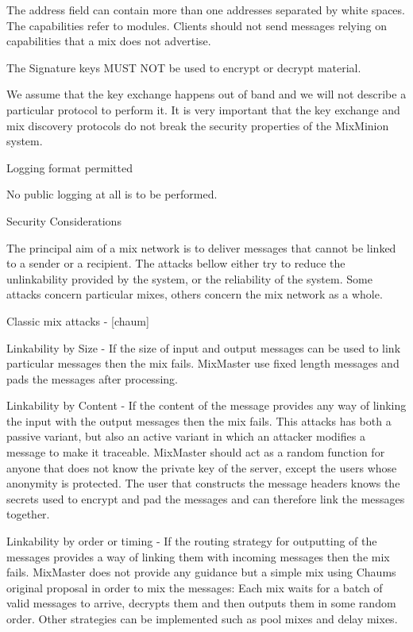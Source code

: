 The address field can contain more than one addresses separated by
white spaces. The capabilities refer to modules. Clients should not 
send messages relying on capabilities that a mix does not advertise.

The Signature keys MUST NOT be used to encrypt or decrypt material.

We assume that the key exchange happens out of band and we will not
describe a particular protocol to perform it. It is very important
that the key exchange and mix discovery protocols do not break the
security properties of the MixMinion system.

Logging format permitted

No public logging at all is to be performed.

Security Considerations

The principal aim of a mix network is
to deliver messages that cannot be linked to a sender or a
recipient. The attacks bellow either try to reduce the unlinkability
provided by the system, or the reliability of the system. Some
attacks concern particular mixes, others concern the mix network as a
whole.

Classic mix attacks - [chaum]

Linkability by Size - If the size of input and output messages can be
used to link particular messages then the mix fails. MixMaster use
fixed length messages and pads the messages after processing.

Linkability by Content - If the content of the message provides any
way of linking the input with the output messages then the mix
fails. This attacks has both a passive variant, but also an active
variant in which an attacker modifies a message to make it
traceable. MixMaster should act as a random function for anyone that
does not know the private key of the server, except the users whose
anonymity is protected. The user that constructs the message headers
knows the secrets used to encrypt and pad the messages and can
therefore link the messages together.

Linkability by order or timing - If the routing strategy for
outputting of the messages provides a way of linking them with
incoming messages then the mix fails. MixMaster does not provide any
guidance but a simple mix using Chaums original proposal in order to
mix the messages: Each mix waits for a batch of valid messages to
arrive, decrypts them and then outputs them in some random
order. Other strategies can be implemented such as pool mixes and
delay mixes.

